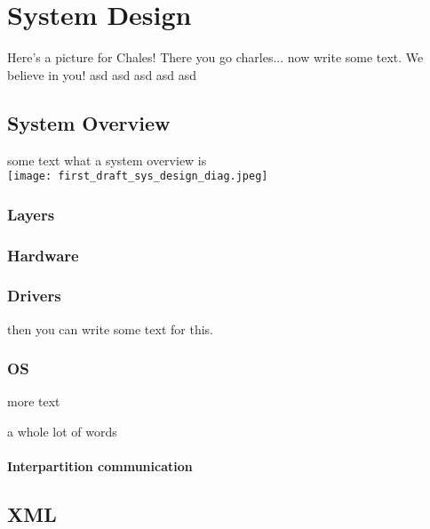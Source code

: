 \chapter{System Design}

Here's a picture for Chales!
There you go charles... now write some text. We believe in you!
asd
asd
asd
asd
asd

\section{System Overview}
some text what a system overview is \\
\texttt{[image: first\_draft\_sys\_design\_diag.jpeg]}

\subsection{Layers}


\subsection{Hardware}

\subsection{Drivers}
\begin{description}[align=left]
	\item [\textbf{UART driver}] then you can write some text for this.
\end{description}

\subsection{OS}
\begin{description}[align=left]
	\item [\textbf{scheduler}] more text
	\item [\textbf{scheduler}] a whole lot of words
\end{description}
\subsubsection{Interpartition communication}

\section{XML}

